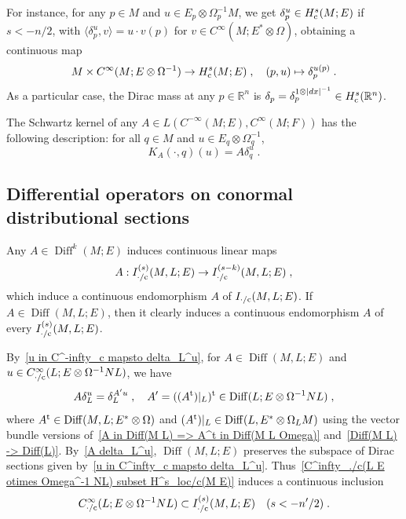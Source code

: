 \documentclass{memo-l}
\theoremstyle{plain}
\theoremstyle{definition}
\theoremstyle{remark}
\newcommand{\R}{\mathbb{R}}
\newcommand{\Diff}{\operatorname{Diff}}
\newcommand{\co}{{\text{\rm c}}}
\newcommand{\trans}{{\text{\rm t}}}
\numberwithin{section}{chapter}
\numberwithin{equation}{section}%
\begin{document}
For instance, for any $p\in M$ and $u\in E_p\otimes\Omega_p^{-1}M$, we get $\delta_p^u\in H^s_\co(M;E)$ if $s<-n/2$, with $\langle\delta_p^u,v\rangle=u\cdot v(p)$ for $v\in C^\infty(M;E^*\otimes\Omega)$, obtaining a continuous map
\begin{equation}\label{(p u) mapsto delta_p^u(p)}
M\times C^\infty(M;E\otimes\Omega^{-1})\to H^s_\co(M;E)\;,\quad(p,u)\mapsto\delta_p^{u(p)}\;.
\end{equation}
As a particular case, the Dirac mass at any $p\in\R^n$ is $\delta_p=\delta_p^{1\otimes|dx|^{-1}}\in H^s_\co(\R^n)$. %

The Schwartz kernel of any $A\in L(C^{-\infty}(M;E),C^\infty(M;F))$ has the following description: for all $q\in M$ and $u\in E_q\otimes\Omega_q^{-1}$,
\begin{equation}\label{K_A(cdot q)(u) = A delta_q^u}
K_A(\cdot,q)(u)=A\delta_q^u\;.
\end{equation}



\subsection{Differential operators on conormal distributional sections}\label{ss: diff opers on conormal distribs}

Any $A\in\Diff^k(M;E)$ induces continuous linear maps \cite[Lemma~6.1.1]{Melrose1996}
\begin{equation}\label{A: I^(s)(M L E) -> I^[s-k](M L E)}
A:I^{(s)}_{{\cdot}/\co}(M,L;E)\to I^{(s-k)}_{{\cdot}/\co}(M,L;E)\;,
\end{equation}
which induce a continuous endomorphism $A$ of $I_{{\cdot}/\co}(M,L;E)$. If $A\in\Diff(M,L;E)$, then it clearly induces a continuous endomorphism $A$ of every $I^{(s)}_{{\cdot}/\co}(M,L;E)$.

By~\eqref{u in C^-infty_c mapsto delta_L^u}, for $A\in\Diff(M,L;E)$ and $u\in C^\infty_{{\cdot}/\co}(L;E\otimes\Omega^{-1}NL)$, we have \cite[Eq.~(4.17)]{AlvKordyLeichtnam-conormal}
\begin{equation}\label{A delta_L^u}
A\delta_L^u=\delta_L^{A'u}\;,\quad A'=((A^\trans)|_L)^\trans\in\Diff(L;E\otimes\Omega^{-1}NL)\;,
\end{equation}
where $A^\trans\in\Diff(M,L;E^*\otimes\Omega)$ and $(A^\trans)|_L\in\Diff(L,E^*\otimes\Omega_LM)$ using the vector bundle versions of~\eqref{A in Diff(M L) => A^t in Diff(M L Omega)} and~\eqref{Diff(M L) -> Diff(L)}. By~\eqref{A delta_L^u}, $\Diff(M,L;E)$ preserves the subspace of Dirac sections given by~\eqref{u in C^infty_c mapsto delta_L^u}. Thus~\eqref{C^infty_./c(L E otimes Omega^-1 NL) subset H^s_loc/c(M E)} induces a continuous inclusion
\begin{equation}\label{u mapsto delta_L^u conormal}
C^\infty_{{\cdot}/\co}(L;E\otimes\Omega^{-1}NL)\subset I^{(s)}_{{\cdot}/\co}(M,L;E)\quad(s<-n'/2)\;.
\end{equation}
\end{document}
